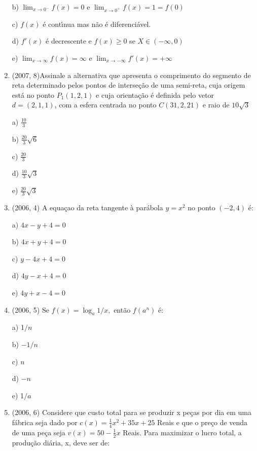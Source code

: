 \documentclass{article}
\begin{document}
\begin{enumerate}
b) $\lim_{x \rightarrow 0^-} f(x) =0 $ e $\lim_{x \rightarrow 0^+} f(x) = 1 = f(0) $

c) $f(x)$ é contı́nua mas não é diferenciável.

d) $f'(x)$ é decrescente e $f(x) \geq 0$ se $X \in (-\infty,0) $

e) $\lim_{x \rightarrow \infty} f(x) = \infty$ e $\lim_{x \rightarrow -\infty} f'(x) = +\infty$\newline



\item(2007, 8)Assinale a alternativa que apresenta o comprimento do segmento de reta determinado pelos pontos de interseção de uma semi-reta, cuja origem está no ponto $P_1 (1, 2, 1)$ e cuja orientação é definida pelo vetor $d = (2, 1, 1)$, com a esfera centrada no ponto $C(31, 2, 21)$ e raio de $10\sqrt{3}$

a) $\frac{10}{3}$

b) $\frac{20}{3}\sqrt{6}$

c) $\frac{20}{3}$

d) $\frac{10}{3}\sqrt{3}$

e) $\frac{20}{3}\sqrt{3}$\newline




\item(2006, 4) A equaçao da reta tangente à parábola $y=x^{2}$ no ponto $(-2,4)$ é: 

a) $4x-y+4=0$

b) $4x+y+4=0$

c) $y-4x+4=0$

d) $4y-x+4=0$

e) $4y+x-4=0$ \newline



\item(2006, 5) Se $f(x)=\log _{a} 1 / x,$ então $f\left(a^{n}\right)$ é:

a) 1$/ n$

b) $-1 / n$

c) $n$

d) $-n$

e) 1$/ a$\newline


\item(2006, 6) Considere que custo total para se produzir x peças por dia em uma fábrica seja dado por $c(x)=\frac{1}{4} x^{2}+35 x+25$ Reais e que o preço de venda de uma peça seja $v(x)=50-\frac{1}{2} x$ Reais. Para maximizar o lucro total, a produção diária, x, deve ser de:


\end{enumerate}
\end{document}
